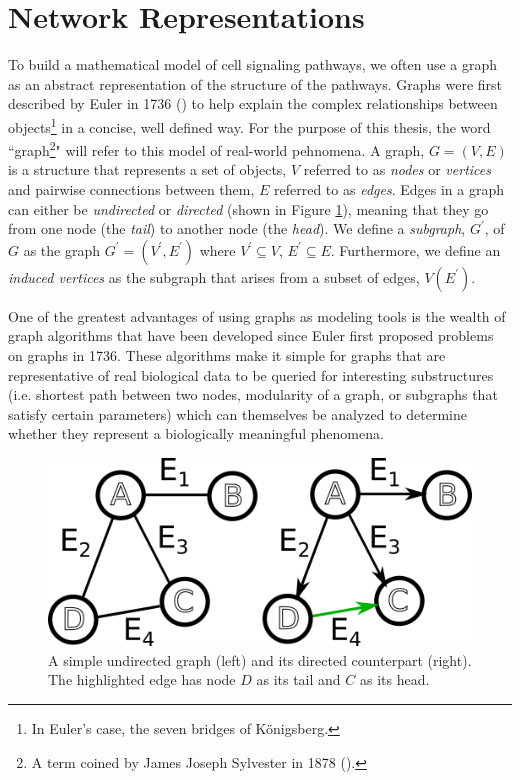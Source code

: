 \documentclass[12pt,twoside]{reedthesis}
\theoremstyle{definition}
\begin{document}
 \section{Network Representations}

  To build a mathematical model of cell signaling pathways, we often use a graph as an abstract representation of the structure of the pathways. Graphs were first described by Euler in 1736 (\cite{Shields2012}) to help explain the complex relationships between objects\footnote{In Euler's case, the seven bridges of K\"{o}nigsberg.} in a concise, well defined way. For the purpose of this thesis, the word ``graph\footnote{A term coined by James Joseph Sylvester in 1878 (\cite{Biggs1986}).}" will refer to this model of real-world pehnomena. A graph, $G=(V,E)$ is a structure that represents a set of objects, $V$ referred to as \textit{nodes} or \textit{vertices} and pairwise connections between them, $E$ referred to as \textit{edges}. Edges in a graph can either be \textit{undirected} or \textit{directed} (shown in Figure \ref{fig:simple_graph_du}), meaning that they go from one node (the \textit{tail}) to another node (the \textit{head}). We define a \textit{subgraph}, $G^\prime$, of $G$ as the graph $G^\prime=(V^\prime,E^\prime)$ where $V^\prime \subseteq V$, $E^\prime \subseteq E$. Furthermore, we define an \textit{induced vertices} as the subgraph that arises from a subset of edges, $V(E^\prime)$.\par

  One of the greatest advantages of using graphs as modeling tools is the wealth of graph algorithms that have been developed since Euler first proposed problems on graphs in 1736. These algorithms make it simple for graphs that are representative of real biological data to be queried for interesting substructures (i.e. shortest path between two nodes, modularity of a graph, or subgraphs that satisfy certain parameters) which can themselves be analyzed to determine whether they represent a biologically meaningful phenomena.\par

  \begin{figure}[!h]
    \begin{center}
      \includegraphics[width=\textwidth/2]{simple_graph_du}
    \caption[Undirected \& Directed Graphs]{A simple undirected graph (left) and its directed counterpart (right). The highlighted edge has node $D$ as its tail and $C$ as its head.}
    \label{fig:simple_graph_du}
    \end{center}
  \end{figure}
\end{document}
